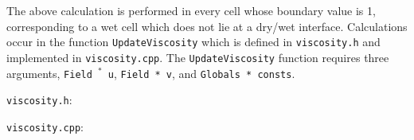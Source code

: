 The above calculation is performed in every cell whose boundary value is \num{1}, corresponding to a wet cell which does not lie at a dry/wet interface. Calculations occur in the function \texttt{UpdateViscosity} which is defined in \texttt{viscosity.h} and implemented in \texttt{viscosity.cpp}. The \texttt{UpdateViscosity} function requires three arguments, \texttt{Field $^*$ u}, \texttt{Field * v}, and \texttt{Globals * consts}. 


\bigskip\noindent \texttt{viscosity.h}:

\bigskip\noindent \texttt{viscosity.cpp}:


